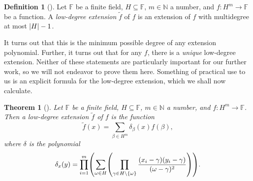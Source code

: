 \documentclass[english,12pt]{reedthesis}
\theoremstyle{plain}
\newtheorem{thm}{Theorem}[section]
\theoremstyle{definition}
\newtheorem{defn}[defn]{Definition}
\theoremstyle{remark}
\DeclarePairedDelimiter{\abs}{\lvert}{\rvert}
\begin{document}
\begin{defn}[{\cite[]{CFGS22}}]\label{def:low-deg-ext}
  Let $\mathbb{F}$ be a finite field, $H \subseteq \mathbb{F}$, $m \in \mathbb{N}$ a number, and
  $f\colon H^{m} \rightarrow \mathbb{F}$ be a function. A \emph{low-degree extension}
  $\tilde{f}$ of $f$ is an extension of $f$ with multidegree at most
  $\abs{H} - 1$.
\end{defn}

It turns out that this is the minimum possible degree of any extension
polynomial. Further, it turns out that for any $f$, there is a \emph{unique}
low-degree extension. Neither of these statements are particularly important for
our further work, so we will not endeavor to prove them here. Something of
practical use to us is an explicit formula for the low-degree extension, which
we shall now calculate.

\begin{thm}[{\cite[]{CFGS22}}]\label{thm:low-deg-ext-exists}
  Let $\mathbb{F}$ be a finite field, $H \subseteq \mathbb{F}$, $m \in \mathbb{N}$ a number, and
  $f\colon H^{m} \rightarrow \mathbb{F}$. Then a low-degree extension $\tilde{f}$ of $f$
  is the function
  \begin{equation}
    \tilde{f}(x) = \sum_{\beta \in H^{m}}\delta_{\beta}(x)f(\beta),
  \end{equation}
  where $\delta$ is the polynomial
  \begin{equation}\label{eqn:delta-poly}
    \delta_{x}(y) = \prod_{i = 1}^{m}\mleft(\sum_{\omega \in H}\mleft(
        \prod_{\gamma \in H \setminus \{\omega\}}\frac{(x_{i} - \gamma)(y_{i} - \gamma)}{(\omega - \gamma)^{2}}
      \mright)\mright).
  \end{equation}
\end{thm}
\end{document}
